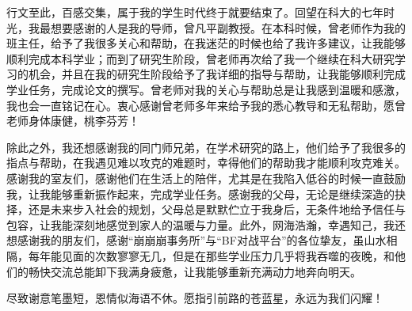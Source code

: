 
\begin{acknowledgements}

行文至此，百感交集，属于我的学生时代终于就要结束了。回望在科大的七年时光，我最想要感谢的人是我的导师，曾凡平副教授。在本科时候，曾老师作为我的班主任，给予了我很多关心和帮助，在我迷茫的时候也给了我许多建议，让我能够顺利完成本科学业；而到了研究生阶段，曾老师再次给了我一个继续在科大研究学习的机会，并且在我的研究生阶段给予了我详细的指导与帮助，让我能够顺利完成学业任务，完成论文的撰写。曾老师对我的关心与帮助总是让我感到温暖和感激，我也会一直铭记在心。衷心感谢曾老师多年来给予我的悉心教导和无私帮助，愿曾老师身体康健，桃李芬芳！

除此之外，我还想感谢我的同门师兄弟，在学术研究的路上，他们给予了我很多的指点与帮助，在我遇见难以攻克的难题时，幸得他们的帮助我才能顺利攻克难关。感谢我的室友们，感谢他们在生活上的陪伴，尤其是在我陷入低谷的时候一直鼓励我，让我能够重新振作起来，完成学业任务。感谢我的父母，无论是继续深造的抉择，还是未来步入社会的规划，父母总是默默伫立于我身后，无条件地给予信任与包容，让我能深刻地感觉到家人的温暖与力量。此外，网海浩瀚，幸遇知己，我还想感谢我的朋友们，感谢“崩崩崩事务所”与“BF对战平台”的各位挚友，虽山水相隔，每年能见面的次数寥寥无几，但是在那些学业压力几乎将我吞噬的夜晚，和他们的畅快交流总能卸下我满身疲惫，让我能够重新充满动力地奔向明天。

尽致谢意笔墨短，恩情似海语不休。愿指引前路的苍蓝星，永远为我们闪耀！
\end{acknowledgements}
